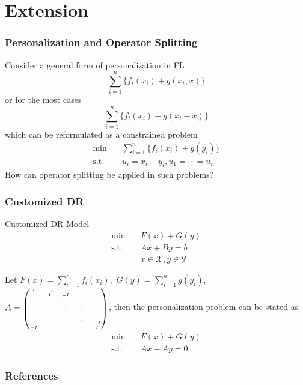 
\section{Extension}


\begin{frame}
\frametitle{Personalization and Operator Splitting}

Consider a general form of personalization in FL
$$\sum_{i=1}^n \{ f_i(x_i) + g(x_i,x) \}$$
or for the most cases
$$\sum_{i=1}^n \{ f_i(x_i) + g(x_i-x) \}$$
which can be reformulated as a constrained problem
\begin{align*}
    \min & \quad \sum_{i=1}^n \{ f_i(x_i) + g(y_i) \} \\
    \text{s.t.} & \quad u_i = x_i-y_i, u_1 = \cdots = u_n
\end{align*}
How can operator splitting be applied in such problems?

\end{frame}


\begin{frame}
\frametitle{Customized DR}

\begin{block}{Customized DR Model}
\vspace{-1em}
\begin{align*}
\text{min} & \quad F(x) + G(y) \\
\text{s.t.} & \quad Ax + By = b \\
& \quad x \in \mathcal{X}, y \in \mathcal{Y}
\end{align*}
\end{block}

Let $F(x) = \sum_{i=1}^n f_i(x_i),$ $G(y) = \sum_{i=1}^n g(y_i)$, $A = \text{{\smaller[5]$\begin{pmatrix} I & -I & & & \\ & I & -I & & \\ & & \ddots & \ddots & \\ & & & \ddots & -I \\ -I & & & & I \end{pmatrix}$}}$, then the personalization problem can be stated as
\begin{align*}
\text{min} & \quad F(x) + G(y) \\
\text{s.t.} & \quad Ax - Ay = 0
\end{align*}

\end{frame}


\begin{frame}[allowframebreaks]
\frametitle{References}

{\footnotesize


}

\end{frame}



